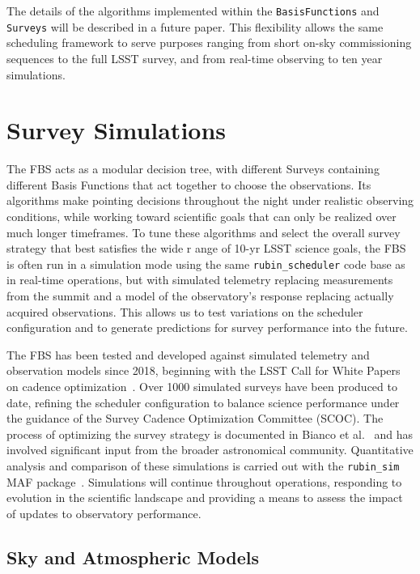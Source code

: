 The details of the algorithms implemented within the \texttt{BasisFunctions} and 
\texttt{Surveys} will be described in a future paper\cite{SMTN-021}. 
This flexibility allows the same scheduling framework to serve purposes ranging
from short on-sky commissioning sequences to the full LSST survey, and from
real-time observing to ten year simulations. 


\section{Survey Simulations}
\label{sec:simulations}


The FBS acts as a modular decision tree, with different Surveys containing 
different Basis Functions that act together to choose the observations. 
Its algorithms make pointing decisions throughout the night under realistic observing conditions, 
while working toward scientific goals that can only be realized over much longer timeframes. 
To tune these algorithms and select the overall survey strategy that best satisfies the wide r
ange of 10-yr LSST science goals, the FBS is often run in a simulation mode using 
the same \texttt{rubin\_scheduler} code base as in real-time operations, 
but with simulated telemetry replacing measurements from the summit and a 
model of the observatory's response replacing actually acquired observations. 
This allows us to test variations on the scheduler configuration and to generate 
predictions for survey performance into the future.

The FBS has been tested and developed against simulated telemetry and
observation models since 2018, beginning with the LSST Call for White Papers on
cadence optimization~\cite{Document-28382}. Over 1000 simulated surveys
have been produced to date, refining the scheduler configuration to balance science performance
under the guidance of the Survey Cadence Optimization Committee (SCOC). 
The process of optimizing the survey strategy is
documented in Bianco et al.~\cite{2022ApJS..258....1B} and has involved significant
input from the broader astronomical community. Quantitative analysis and comparison 
of these simulations is carried out with the \texttt{rubin\_sim}~\cite{peter_yoachim_2026_20451985}
 MAF package~\cite{2014SPIE.9149E..0BJ}. 
Simulations will continue throughout operations, responding to evolution in the scientific landscape and
providing a means to assess the impact of updates to observatory performance.

\subsection{Sky and Atmospheric Models}
\label{sec:env_models}

